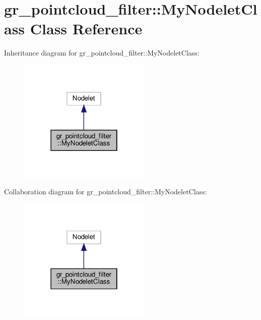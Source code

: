 \hypertarget{classgr__pointcloud__filter_1_1MyNodeletClass}{}\section{gr\+\_\+pointcloud\+\_\+filter\+:\+:My\+Nodelet\+Class Class Reference}
\label{classgr__pointcloud__filter_1_1MyNodeletClass}


Inheritance diagram for gr\+\_\+pointcloud\+\_\+filter\+:\+:My\+Nodelet\+Class\+:
\nopagebreak
\begin{figure}[H]
\begin{center}
\leavevmode
\includegraphics[width=178pt]{classgr__pointcloud__filter_1_1MyNodeletClass__inherit__graph}
\end{center}
\end{figure}


Collaboration diagram for gr\+\_\+pointcloud\+\_\+filter\+:\+:My\+Nodelet\+Class\+:
\nopagebreak
\begin{figure}[H]
\begin{center}
\leavevmode
\includegraphics[width=178pt]{classgr__pointcloud__filter_1_1MyNodeletClass__coll__graph}
\end{center}
\end{figure}
